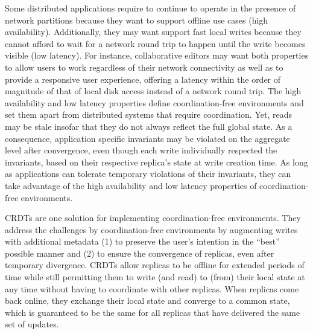 Some distributed applications require to continue to operate in the presence of
network partitions because they want to support offline use cases (high availability).
Additionally, they may want support fast local writes because they cannot afford
to wait for a network round trip to happen until the write becomes
visible (low latency).
For instance, collaborative editors may want both properties to allow users
to work regardless of their network connectivity as well as to provide a
responsive user experience, offering a latency within the order of magnitude
of that of local disk access instead of a network round trip.
The high availability and low latency properties define coordination-free
environments and set them apart from distributed systems that require coordination.
Yet, reads may be stale insofar that they do not always reflect the full global state.
As a consequence, application specific invariants may be violated on the aggregate
level after convergence, even though each write individually respected the invariants,
based on their respective replica's state at write creation time.
As long as applications can tolerate temporary violations of their invariants,
they can take advantage of the high availability and low latency properties
of coordination-free environments.

\acfp{CRDT}\footnotemark{} are one solution for implementing coordination-free
environments.
They address the challenges by coordination-free environments by augmenting
writes with additional metadata (1) to preserve the user's intention
in the ``best'' possible manner and (2) to ensure the convergence of replicas,
even after temporary divergence.
\acp{CRDT} allow replicas to be offline for extended periods of time
while still permitting them to write (and read) to (from) their local state
at any time without having to coordinate with other replicas.
When replicas come back online, they exchange their local state
and converge to a common state, which is guaranteed to be the same for all
replicas that have delivered the same set of updates.


